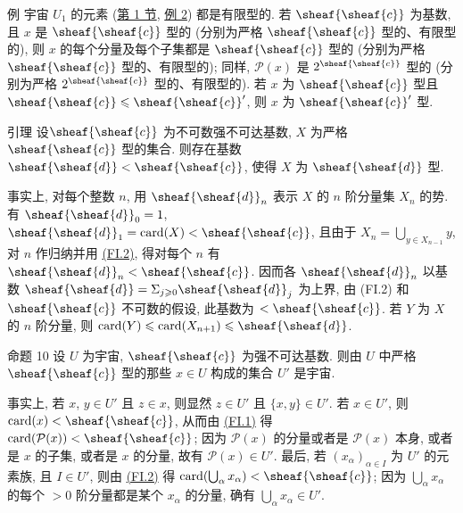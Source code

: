 \begin{enonce*}[remark]{例}
宇宙 $U_1$ 的元素 (\hyperlink{sga4.exp.I.appendix.II.sec.1}{第 1 节}, \hyperlink{sga4.exp.I.appendix.II.sec.1.example.2}{例 2}) 都是有限型的. 若 $\sheaf{\sheaf{c}}$ 为基数, 且 $x$ 是 $\sheaf{\sheaf{c}}$ 型的 (分别为严格 $\sheaf{\sheaf{c}}$ 型的、有限型的), 则 $x$ 的每个分量及每个子集都是 $\sheaf{\sheaf{c}}$ 型的 (分别为严格 $\sheaf{\sheaf{c}}$ 型的、有限型的); 同样, $\mathcal{P}(x)$ 是 $2^{\sheaf{\sheaf{c}}}$ 型的 (分别为严格 $2^{\sheaf{\sheaf{c}}}$ 型的、有限型的). 若 $x$ 为 $\sheaf{\sheaf{c}}$ 型且 $\sheaf{\sheaf{c}}\leq\sheaf{\sheaf{c}}'$, 则 $x$ 为 $\sheaf{\sheaf{c}}'$ 型.
\end{enonce*}

\hypertarget{sga4.exp.I.appendix.II.sec.5.lemma.of.section.5}{}
\begin{enonce*}{引理}
设\pageoriginale $\sheaf{\sheaf{c}}$ 为不可数强不可达基数, $X$ 为严格 $\sheaf{\sheaf{c}}$ 型的集合. 则存在基数 $\sheaf{\sheaf{d}}<\sheaf{\sheaf{c}}$, 使得 $X$ 为 $\sheaf{\sheaf{d}}$ 型.
\end{enonce*}

事实上, 对每个整数 $n$, 用 $\sheaf{\sheaf{d}}_n$ 表示 $X$ 的 $n$ 阶分量集 $X_n$ 的势. 有 $\sheaf{\sheaf{d}}_0=1$, $\sheaf{\sheaf{d}}_1=\card(X)<\sheaf{\sheaf{c}}$, 且由于 $X_n=\bigcup_{y\in X_{n-1}} y$, 对 $n$ 作归纳并用 \hyperlink{sga4.exp.I.appendix.II.sec.5.definition.2.condition.FI.2}{(FI.2)}, 得对每个 $n$ 有 $\sheaf{\sheaf{d}}_n<\sheaf{\sheaf{c}}$. 因而各 $\sheaf{\sheaf{d}}_n$ 以基数 $\sheaf{\sheaf{d}}=\Sigma_{j\geq 0}\sheaf{\sheaf{d}}_j$ 为上界, 由 (FI.2) 和 $\sheaf{\sheaf{c}}$ 不可数的假设, 此基数为 $<\sheaf{\sheaf{c}}$. 若 $Y$ 为 $X$ 的 $n$ 阶分量, 则 $\card(Y)\leq \card(X_{n+1})\leq\sheaf{\sheaf{d}}$. \cqfd

\hypertarget{sga4.exp.I.appendix.II.sec.5.proposition.10}{}
\begin{enonce*}{命题 10}
设 $U$ 为宇宙, $\sheaf{\sheaf{c}}$ 为强不可达基数. 则由 $U$ 中严格 $\sheaf{\sheaf{c}}$ 型的那些 $x\in U$ 构成的集合 $U'$ 是宇宙.
\end{enonce*}
事实上, 若 $x$, $y\in U'$ 且 $z\in x$, 则显然 $z\in U'$ 且 $\{x,y\}\in U'$. 若 $x\in U'$, 则 $\card(x)<\sheaf{\sheaf{c}}$, 从而由 \hyperlink{sga4.exp.I.appendix.II.sec.5.definition.2.condition.FI.1}{(FI.1)} 得 $\card(\mathcal{P}(x))<\sheaf{\sheaf{c}}$; 因为 $\mathcal{P}(x)$ 的分量或者是 $\mathcal{P}(x)$ 本身, 或者是 $x$ 的子集, 或者是 $x$ 的分量, 故有 $\mathcal{P}(x)\in U'$. 最后, 若 $(x_{\alpha})_{\alpha\in I}$ 为 $U'$ 的元素族, 且 $I\in U'$, 则由 \hyperlink{sga4.exp.I.appendix.II.sec.5.definition.2.condition.FI.2}{(FI.2)} 得 $\card(\bigcup_{\alpha}x_{\alpha})<\sheaf{\sheaf{c}}$; 因为 $\bigcup_{\alpha}x_{\alpha}$ 的每个 $>0$ 阶分量都是某个 $x_{\alpha}$ 的分量, 确有 $\bigcup_{\alpha}x_{\alpha}\in U'$. \cqfd


